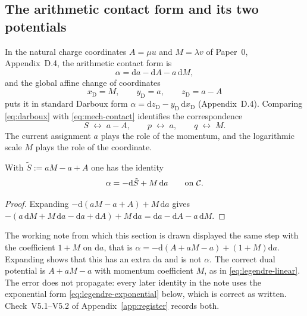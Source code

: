 \subsection{The arithmetic contact form and its two potentials}

In the natural charge coordinates $A=\mu u$ and $M=\lambda v$ of Paper~0,
Appendix~D.4, the arithmetic contact form is
\begin{equation}\label{eq:arith-contact}
  \alpha=\mathrm da-\mathrm dA-a\,\mathrm dM,
\end{equation}
and the global affine change of coordinates
\begin{equation}\label{eq:darboux}
  x_{\mathrm D}=M,
  \qquad
  y_{\mathrm D}=a,
  \qquad
  z_{\mathrm D}=a-A
\end{equation}
puts it in standard Darboux form $\alpha=\mathrm dz_{\mathrm D}-y_{\mathrm D}
\,\mathrm dx_{\mathrm D}$ (Appendix~D.4).  Comparing \eqref{eq:darboux} with
\eqref{eq:mech-contact} identifies the correspondence
\begin{equation}\label{eq:legendre-dictionary}
  S\;\longleftrightarrow\; a-A,
  \qquad
  p\;\longleftrightarrow\;a,
  \qquad
  q\;\longleftrightarrow\;M .
\end{equation}
The current assignment $a$ plays the role of the momentum, and the logarithmic
scale $M$ plays the role of the coordinate.

\begin{lemma}
\label{lem:legendre-linear}
With $\tilde S:=aM-a+A$ one has the identity
\begin{equation}\label{eq:legendre-linear}
  \alpha=-\mathrm d\tilde S+M\,\mathrm da
  \qquad\text{on }\mathcal{C} .
\end{equation}
\end{lemma}

\begin{proof}
Expanding $-\mathrm d(aM-a+A)+M\,\mathrm da$ gives
$-(a\,\mathrm dM+M\,\mathrm da-\mathrm da+\mathrm dA)+M\,\mathrm da
=\mathrm da-\mathrm dA-a\,\mathrm dM$.
\end{proof}

\begin{remark}
\label{rem:legendre-correction}
The working note from which this section is drawn displayed the same step with
the coefficient $1+M$ on $\mathrm da$, that is
$\alpha=-\mathrm d(A+aM-a)+(1+M)\mathrm da$.  Expanding shows that this has an
extra $\mathrm da$ and is not $\alpha$.  The correct dual potential is
$A+aM-a$ with momentum coefficient $M$, as in \eqref{eq:legendre-linear}.  The
error does not propagate: every later identity in the note uses the
exponential form \eqref{eq:legendre-exponential} below, which is correct as
written.  Check~V5.1--V5.2 of Appendix~\ref{app:register} records both.
\end{remark}


